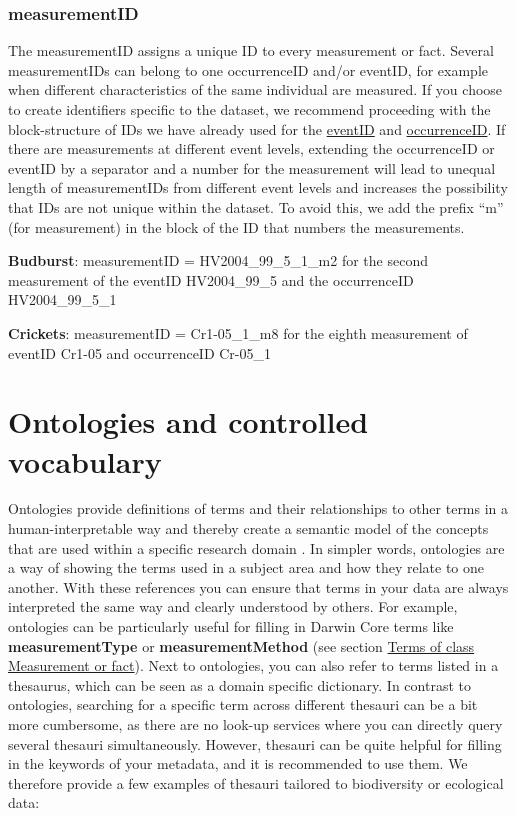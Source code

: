 \documentclass[
  oneside]{book}
\begin{document}
\subsubsection{measurementID}\label{measurementid}

The measurementID assigns a unique ID to every measurement or fact. Several measurementIDs can belong to one occurrenceID and/or eventID, for example when different characteristics of the same individual are measured. If you choose to create identifiers specific to the dataset, we recommend proceeding with the block-structure of IDs we have already used for the \hyperref[eventID]{eventID} and \hyperref[occurrenceID]{occurrenceID}. If there are measurements at different event levels, extending the occurrenceID or eventID by a separator and a number for the measurement will lead to unequal length of measurementIDs from different event levels and increases the possibility that IDs are not unique within the dataset. To avoid this, we add the prefix ``m'' (for measurement) in the block of the ID that numbers the measurements.

\begin{examplebox}

\textbf{Budburst}: measurementID = HV2004\_99\_5\_1\_m2 for the second measurement of the eventID HV2004\_99\_5 and the occurrenceID HV2004\_99\_5\_1

\textbf{Crickets}: measurementID = Cr1-05\_1\_m8 for the eighth measurement of eventID Cr1-05 and occurrenceID Cr-05\_1

\end{examplebox}

\section{Ontologies and controlled vocabulary}\label{ontologies}

Ontologies provide definitions of terms and their relationships to other terms in a human-interpretable way and thereby create a semantic model of the concepts that are used within a specific research domain \autocite{Madin_2008}. In simpler words, ontologies are a way of showing the terms used in a subject area and how they relate to one another. With these references you can ensure that terms in your data are always interpreted the same way and clearly understood by others. For example, ontologies can be particularly useful for filling in Darwin Core terms like \textbf{measurementType} or \textbf{measurementMethod} (see section \hyperref[mof]{Terms of class Measurement or fact}). Next to ontologies, you can also refer to terms listed in a thesaurus, which can be seen as a domain specific dictionary. In contrast to ontologies, searching for a specific term across different thesauri can be a bit more cumbersome, as there are no look-up services where you can directly query several thesauri simultaneously. However, thesauri can be quite helpful for filling in the keywords of your metadata, and it is recommended to use them. We therefore provide a few examples of thesauri tailored to biodiversity or ecological data:
\end{document}
